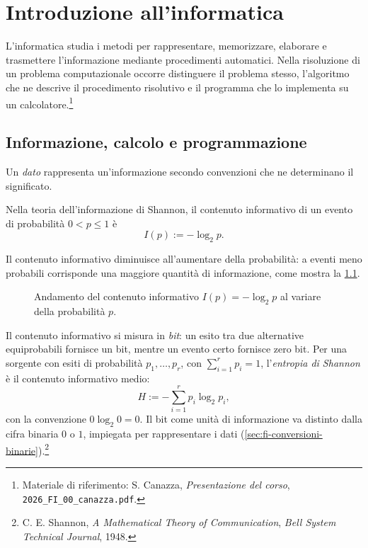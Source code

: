 \chapter{Introduzione all'informatica}
\label{chap:introduzione-informatica}

L'informatica studia i metodi per rappresentare, memorizzare, elaborare
e trasmettere l'informazione mediante procedimenti automatici.
Nella risoluzione di un problema computazionale occorre distinguere
il problema stesso, l'algoritmo che ne descrive il procedimento
risolutivo e il programma che lo implementa su un calcolatore.\footnote{Materiale di riferimento:
S. Canazza, \emph{Presentazione del corso},
\nolinkurl{2026_FI_00_canazza.pdf}.}

\section{Informazione, calcolo e programmazione}
\label{sec:fi-informatica-calcolo}

Un \emph{dato} rappresenta un'informazione secondo convenzioni che ne
determinano il significato.

Nella teoria dell'informazione di Shannon, il contenuto informativo di un
evento di probabilità \(0<p\le1\) è
\[
  I(p):=-\log_2 p.
\]

Il contenuto informativo diminuisce all'aumentare della probabilità:
a eventi meno probabili corrisponde una maggiore quantità di informazione,
come mostra la \cref{fig:fi-contenuto-informativo}.

\begin{figure}[htbp]
  \centering
  
  \caption{Andamento del contenuto informativo \(I(p)=-\log_2 p\) al variare della probabilità \(p\).}
  \label{fig:fi-contenuto-informativo}
\end{figure}

Il contenuto informativo si misura in \emph{bit}: un esito tra due alternative
equiprobabili fornisce un bit, mentre un evento certo fornisce zero bit.
Per una sorgente con esiti di probabilità \(p_1,\ldots,p_r\), con
\(\sum_{i=1}^r p_i=1\), l'\emph{entropia di Shannon} è il contenuto
informativo medio:
\[
  H:=-\sum_{i=1}^{r}p_i\log_2p_i,
\]
con la convenzione \(0\log_2 0=0\). Il bit come unità di informazione va
distinto dalla cifra binaria \(0\) o \(1\), impiegata per rappresentare
i dati (\cref{sec:fi-conversioni-binarie}).\footnote{C. E. Shannon,
\emph{A Mathematical Theory of Communication}, \emph{Bell System
Technical Journal}, 1948.}

